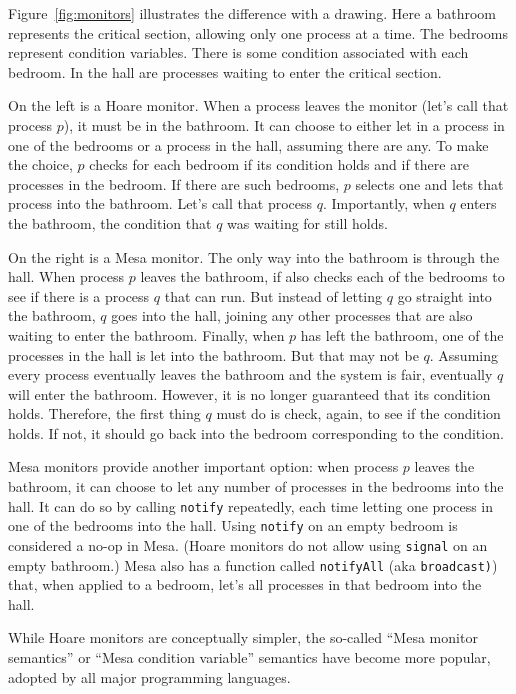 \documentclass{report}
\begin{document}
Figure~\ref{fig:monitors} illustrates the difference with a drawing.
Here a bathroom represents the critical section, allowing only one
process at a time.  The bedrooms represent condition variables.
There is some condition associated with each bedroom.
In the hall are processes waiting to enter the critical section.

On the left is a Hoare monitor.  When a process leaves the monitor
(let's call that process $p$), it must be in the bathroom.
It can choose to either let in a process
in one of the bedrooms or a process in the hall, assuming there are any.
To make the choice, $p$ checks for each bedroom if its condition holds
and if there are processes in the bedroom.
If there are such bedrooms, $p$ selects one and lets that process into
the bathroom.  Let's call that process $q$.  Importantly, when $q$ enters
the bathroom, the condition that $q$ was waiting for still holds.

On the right is a Mesa monitor.  The only way into the bathroom is through
the hall.  When process $p$ leaves the bathroom,
if also checks each of the bedrooms to see if there is a process $q$ that
can run.  But instead of letting $q$ go straight into the bathroom, $q$
goes into the hall, joining any other processes that are also waiting to
enter the bathroom.  Finally, when $p$ has left the bathroom, one of the
processes in the hall is let into the bathroom.  But that may not be $q$.
Assuming every process eventually leaves the bathroom and the system is
fair, eventually $q$ will enter the bathroom.  However, it is no longer
guaranteed that its condition holds.  Therefore, the first thing $q$ must
do is check, again, to see if the condition holds.  If not, it should go back
into the bedroom corresponding to the condition.

Mesa monitors provide another important option:
when process $p$ leaves the bathroom, it can choose to let any number of
processes in the bedrooms into the hall.  It can do so by calling
\texttt{notify} repeatedly, each time letting one process in one of the
bedrooms into the hall.  Using \texttt{notify} on an empty
bedroom is considered a no-op in Mesa.  (Hoare monitors do not allow
using \texttt{signal} on an empty bathroom.) Mesa also has a function called
\texttt{notifyAll}
(aka \texttt{broadcast)})
that, when applied to
a bedroom, let's all processes in that bedroom into the hall.

While Hoare monitors are conceptually simpler, the so-called
``Mesa monitor semantics'' or ``Mesa condition variable'' semantics
have become more popular, adopted by all major
programming languages.
\end{document}
